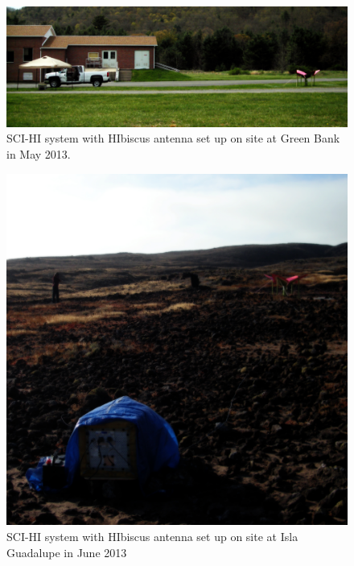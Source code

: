 \begin{figure}[htb]
\begin{center}

\includegraphics[width=0.95\linewidth]{SCIHI_system/figures/SCIHI_gbt_sys.jpg}
\caption{SCI-HI system with HIbiscus antenna set up on site at Green Bank in May 2013.}
\label{Fig:sys_gbt}

\end{center}
\end{figure}


\begin{figure}[htb]
\begin{center}
\includegraphics[width=0.85\linewidth]{SCIHI_system/figures/SCIHI_guad_sys.jpg}
\caption{SCI-HI system with HIbiscus antenna set up on site at Isla Guadalupe in June 2013}
\label{Fig:sys_guad}

\end{center}
\end{figure}


